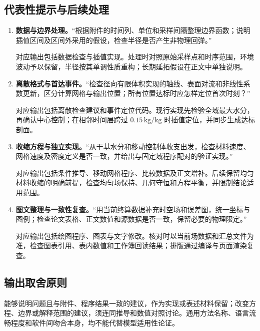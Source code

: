 \documentclass[withoutpreface,bwprint]{commons/cumcmthesis}
\newenvironment{promptblock}{\begin{minipage}[t]{\linewidth}\setlength{\parindent}{0pt}}{\end{minipage}}
\begin{document}
\subsection{代表性提示与后续处理}
\begin{enumerate}[label=\textbf{（\arabic*）},leftmargin=2.6em]
  \item \begin{promptblock}\textbf{数据与边界处理。}“根据附件的时间列、单位和采样间隔整理边界函数；说明插值区间及区间外采用的假设，检查半径是否产生非物理回弹。”

  对应输出包括数据检查与插值实现。处理时对照原始采样点和时序范围，环境波动予以保留，半径按其单调性质重构；长期延拓假设在正文中单独说明。
  \end{promptblock}

  \item \begin{promptblock}\textbf{离散格式与首达事件。}“检查径向有限体积实现的轴线、表面对流和非线性系数更新，区分计算网格与输出位置；所有位置达标时应怎样定位首次时刻？”

  对应输出包括离散检查建议和事件定位代码。现行实现先检验全域最大水分，再确认中心控制；在相邻时间层跨过 $0.15\,\mathrm{kg/kg}$ 时插值定位，并同步生成达标剖面。
  \end{promptblock}

  \item \begin{promptblock}\textbf{收缩方程与独立实现。}“从干基水分和移动控制体收支出发，检查材料速度、网格速度及密度定义是否一致，并给出与固定域程序配对的验证实现。”

  对应输出包括条件推导、移动网格程序、比较数据及正文增补。后续保留均匀材料收缩的明确前提，检查均匀场保持、几何守恒和方程平衡，并限制结论适用范围。
  \end{promptblock}

  \par\newpage
  \item \begin{promptblock}\textbf{图文整理与一致性复查。}“用当前终算数据补充时空场和误差图，统一坐标与图例；检查论文表格、正文数值和源数据是否一致，保留必要的物理限定。”

  对应输出包括绘图程序、图表与文字修改。核对时以当前场数据和汇总文件为准，检查图表引用、表内数值和工作簿回读结果；排版通过编译与页面渲染复查。
  \end{promptblock}
\end{enumerate}

\subsection{输出取舍原则}
能够说明问题且与附件、程序结果一致的建议，作为实现或表述材料保留；改变方程、边界或解释范围的建议，须连同推导和数值对照讨论。通用方法名称、语言流畅程度和软件间吻合本身，均不能代替模型适用性论证。
\end{document}
